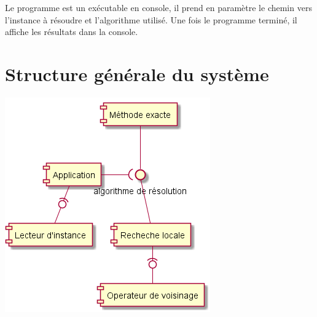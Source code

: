 Le programme est un exécutable en console, il prend en paramètre le chemin vers l'instance à résoudre et l'algorithme utilisé.
Une fois le programme terminé, il affiche les résultats dans la console.


\section{Structure générale du système}

\includegraphics[width=\textwidth]{parts/description_generale/composants}